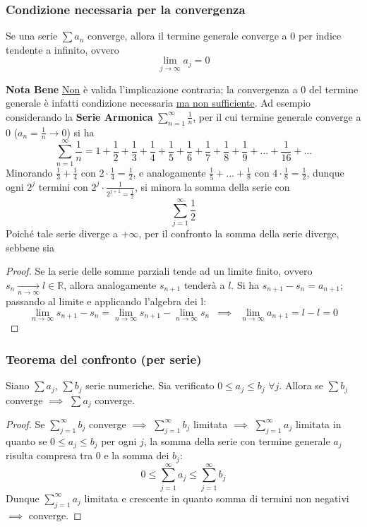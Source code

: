 \documentclass[10pt]{article}
\theoremstyle{plain}
\begin{document}
\subsubsection{Condizione necessaria per la convergenza}
\begin{prop}
Se una serie $\sum a_n$ converge, allora il termine generale converge a 0 per indice tendente a infinito, ovvero
\[\lim \limits_{j \rightarrow \infty} a_j = 0\]
\end{prop}
\textbf{Nota Bene} \underline{Non} è valida l'implicazione contraria; la convergenza a 0 del termine generale è infatti condizione necessaria \underline{ma non sufficiente}. Ad esempio considerando la \textbf{Serie Armonica} $\sum_{n=1}^{\infty} \frac{1}{n}$, per il cui termine generale converge a 0 ($a_n = \frac{1}{n} \rightarrow 0$) si ha
\[\sum_{n=1}^{\infty} \frac{1}{n} = 1 + \frac{1}{2} + \frac{1}{3} + \frac{1}{4} + \frac{1}{5} + \frac{1}{6} + \frac{1}{7} + \frac{1}{8} + \frac{1}{9} + ... + \frac{1}{16} + ...\]
Minorando $\frac{1}{3} + \frac{1}{4}$ con $2 \cdot \frac{1}{4} = \frac{1}{2}$, e analogamente $\frac{1}{5} + ... + \frac{1}{8}$ con $4 \cdot \frac{1}{8} = \frac{1}{2}$, dunque ogni $2^j$ termini con $2^j \cdot \frac{1}{2^{j+1} = \frac{1}{2}}$, si minora la somma della serie con 
\[\sum \limits_{j = 1}^{\infty} \frac{1}{2}\]
Poiché tale serie diverge a $+ \infty$, per il confronto la somma della serie diverge, sebbene sia 
\begin{proof}
Se la serie delle somme parziali tende ad un limite finito, ovvero $s_n \xrightarrow[n \rightarrow \infty]{} l \in \mathbb{R}$, allora analogamente $s_{n + 1}$ tenderà a $l$. Si ha $s_{n+1} - s_n = a_{n + 1}$; passando al limite e applicando l'algebra dei l:
\[\lim \limits_{n \rightarrow \infty} s_{n+1} - s_n = \lim \limits_{n \rightarrow \infty} s_{n+1} - \lim \limits_{n \rightarrow \infty} s_{n} \enspace \implies \enspace \lim \limits_{n \rightarrow \infty} a_{n+1} = l - l = 0\]
\end{proof}

\subsubsection{Teorema del confronto (per serie)}
\begin{ther}
Siano $\sum a_j$, $\sum b_j$ serie numeriche. Sia verificato $0 \leq a_j \leq b_j$ $\forall j$. Allora se $\sum b_j$ converge $\implies$ $\sum a_j$ converge.
\end{ther}
\begin{proof}
Se $\sum_{j=1}^{\infty} b_j$ converge $\implies$ $\sum_{j=1}^{\infty} b_j$ limitata $\implies$ $\sum_{j=1}^{\infty} a_j$ limitata in quanto se $0 \leq a_j \leq b_j$ per ogni $j$, la somma della serie con termine generale $a_j$ risulta compresa tra 0 e la somma dei $b_j$:
\[0 \leq \sum_{j=1}^{\infty} a_j \leq \sum_{j=1}^{\infty} b_j\]
Dunque $\sum_{j=1}^{\infty} a_j$ limitata e crescente in quanto somma di termini non negativi $\implies$ converge.
\end{proof}
\end{document}
